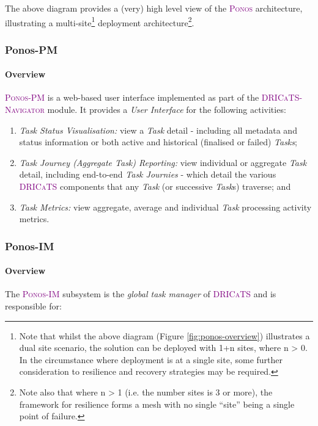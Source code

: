 \documentclass[a4paper]{book}
\newcommand{\dricats}{\textsc{\textcolor{Purple}{\small{DRICaTS }}}}
\newcommand{\ponos}{\textsc{\textcolor{Purple}{\small{Ponos }}}}
\newcommand{\ponosim}{\textsc{\textcolor{Purple}{\small{Ponos-IM }}}}
\newcommand{\ponospm}{\textsc{\textcolor{Purple}{\small{Ponos-PM }}}}
\newcommand{\dricatsnavigator}{\textsc{\textcolor{Purple}{\small{DRICaTS-Navigator }}}}
\begin{document}
The above diagram provides a (very) high level view of the \ponos architecture, illustrating a multi-site\footnote{Note that whilst the above diagram (Figure \ref{fig:ponos-overview}) illustrates a dual site scenario, the solution can be deployed with 1+n sites, where n > 0. In the circumstance where deployment is at a single site, some further consideration to resilience and recovery strategies may be required.} deployment architecture\footnote{Note also that where n > 1 (i.e. the number sites is 3 or more), the framework for resilience forms a mesh with no single ``site'' being a single point of failure.}.

\subsubsection{Ponos-PM}
\paragraph{Overview}

\ponospm is a web-based user interface implemented as part of the \dricatsnavigator module. It provides a \textit{User Interface} for the following activities:
\begin{enumerate}[noitemsep]
 \item \textit{Task Status Visualisation:} view a \textit{Task} detail - including all metadata and status information or both active and historical (finalised or failed) \textit{Tasks};
 \item \textit{Task Journey (Aggregate Task) Reporting:} view individual or aggregate \textit{Task} detail, including end-to-end \textit{Task Journies} - which detail the various \dricats components that any \textit{Task} (or successive \textit{Task}s) traverse; and
 \item \textit{Task Metrics:} view aggregate, average and individual \textit{Task} processing activity metrics.
\end{enumerate}

\subsubsection{Ponos-IM}

\paragraph{Overview}

The \ponosim subsystem is the \textit{global task manager} of \dricats and is responsible for:
\end{document}
